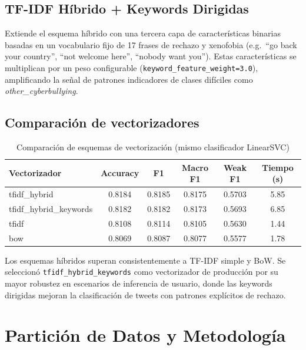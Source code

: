 ﻿\documentclass[12pt,a4paper]{article}
\begin{document}
\subsection{TF-IDF Híbrido + Keywords Dirigidas}
Extiende el esquema híbrido con una tercera capa de características binarias
basadas en un vocabulario fijo de 17 frases de rechazo y xenofobia
(e.g.\ ``go back your country'', ``not welcome here'', ``nobody want you'').
Estas características se multiplican por un peso configurable
(\texttt{keyword\_feature\_weight=3.0}), amplificando la señal de patrones
indicadores de clases difíciles como \textit{other\_cyberbullying}.

\subsection{Comparación de vectorizadores}

\begin{table}[H]
\centering
\caption{Comparación de esquemas de vectorización (mismo clasificador LinearSVC)}
\label{tab:vec_comp}
\begin{tabular}{lccccc}
\toprule
Vectorizador & Accuracy & F1 & Macro F1 & Weak F1 & Tiempo (s) \\
\midrule
tfidf\_hybrid          & 0.8184 & 0.8185 & 0.8175 & 0.5703 & 5.85 \\
tfidf\_hybrid\_keywords & 0.8182 & 0.8182 & 0.8173 & 0.5693 & 6.85 \\
tfidf                  & 0.8108 & 0.8114 & 0.8105 & 0.5630 & 1.44 \\
bow                    & 0.8069 & 0.8087 & 0.8077 & 0.5577 & 1.78 \\
\bottomrule
\end{tabular}
\end{table}

Los esquemas híbridos superan consistentemente a TF-IDF simple y BoW.
Se seleccionó \texttt{tfidf\_hybrid\_keywords} como vectorizador de
producción por su mayor robustez en escenarios de inferencia de usuario,
donde las keywords dirigidas mejoran la clasificación de tweets con
patrones explícitos de rechazo.

\section{Partición de Datos y Metodología}
\end{document}
